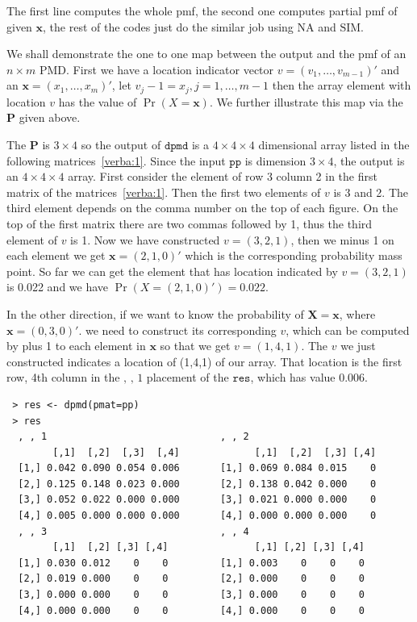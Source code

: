 \documentclass[12pt]{article}
\newcommand{\Pmat}{\mathbf{P}}
\newcommand{\PMD}{\textrm{PMD}}
\newcommand{\Xvec}{\boldsymbol{X}}
\newcommand{\xvec}{\boldsymbol{x}}
\newcommand{\code}{\texttt}
\newcommand{\SIM}{{\textrm{SIM}}}
\newcommand{\NA}{{\textrm{NA}}}
\begin{document}
The first line computes the whole pmf, the second one computes partial pmf of given $\xvec$, the rest of the codes just do the similar job using $\NA$ and $\SIM$.

We shall demonstrate the one to one map between the output and the pmf of an $n \times m$ $\PMD$. First we have a location indicator vector $v = (v_1, \dots, v_{m-1})'$ and an $\xvec=(x_1,\dots,x_m)'$, let $v_j-1 = x_j, j =1,\dots,m-1$ then the array element with location $v$ has the value of $\Pr(X=\xvec)$. We further illustrate this map via the $\Pmat$ given above.

The $\Pmat$ is $3 \times 4$ so the output of $\code{dpmd}$ is a $4 \times 4 \times 4$ dimensional array listed in the following matrices~\ref{verba:1}. Since the input $\code{pp}$ is dimension $3 \times 4$, the output is an $4 \times 4 \times 4$ array. First consider the element of row 3 column 2 in the first matrix of the matrices~\ref{verba:1}. Then the first two elements of $v$ is 3 and 2. The third element depends on the comma number on the top of each figure. On the top of the first matrix there are two commas followed by 1, thus the third element of $v$ is 1. Now we have constructed $v = (3,2,1)$, then we minus 1 on each element we get $\xvec=(2,1,0)'$ which is the corresponding probability mass point. So far we can get the element that has location indicated by $v=(3,2,1)$ is 0.022 and we have $\Pr(X=(2,1,0)')=0.022$. 

In the other direction, if we want to know the probability of $\Xvec=\xvec$, where $\xvec=(0,3,0)'$. we need to construct its corresponding $v$, which can be computed by plus 1 to each element in $\xvec$ so that we get $v=(1,4,1)$. The $v$ we just constructed indicates a location of (1,4,1) of our array. That location is the first row, 4th column in the $\text{, , 1}$ placement of the $\code{res}$, which has value 0.006.

\begin{verbatim}
 > res <- dpmd(pmat=pp)
 > res
  , , 1                              , , 2
        [,1]  [,2]  [,3]  [,4]             [,1]  [,2]  [,3] [,4] 
  [1,] 0.042 0.090 0.054 0.006       [1,] 0.069 0.084 0.015    0 
  [2,] 0.125 0.148 0.023 0.000       [2,] 0.138 0.042 0.000    0 
  [3,] 0.052 0.022 0.000 0.000       [3,] 0.021 0.000 0.000    0 
  [4,] 0.005 0.000 0.000 0.000       [4,] 0.000 0.000 0.000    0 
  , , 3                              , , 4                     
        [,1]  [,2] [,3] [,4]               [,1] [,2] [,3] [,4]
  [1,] 0.030 0.012    0    0         [1,] 0.003    0    0    0 
  [2,] 0.019 0.000    0    0         [2,] 0.000    0    0    0 
  [3,] 0.000 0.000    0    0         [3,] 0.000    0    0    0 
  [4,] 0.000 0.000    0    0         [4,] 0.000    0    0    0 
\end{verbatim}
\label{verba:1}
\end{document}

